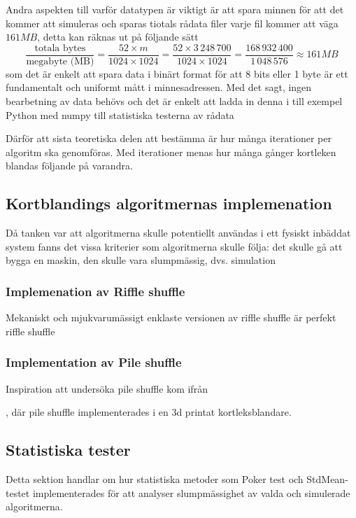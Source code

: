 \documentclass[swedish,a4paper]{article}
\begin{document}
Andra aspekten till varför datatypen är viktigt är att spara minnen för att det
kommer att simuleras och sparas tiotals rådata filer varje fil kommer att väga
$161 MB$,
detta kan räknas ut på följande sätt
$$ \frac{\text{totala bytes}}{\text{megabyte (MB)}} = \frac{52 \times m }{1024 \times
1024} = \frac{52 \times 3\,248\,700}{1024 \times 1024} = \frac{168\,932\,400}{1\,048\,576} \approx 161 MB 
$$
som det är enkelt att spara data i binärt format för att 8 bits eller 1 byte
är ett fundamentalt och uniformt mått i minnesadressen. Med det sagt, ingen
bearbetning av data behövs och det är enkelt att ladda in denna i till exempel Python
med numpy till statistiska testerna av rådata

Därför att sista teoretiska delen att bestämma
är hur många iterationer per algoritm ska genomföras. Med iterationer menas
hur många gånger kortleken blandas följande på varandra.

\subsection{Kortblandings algoritmernas implemenation}

Då tanken var att  algoritmerna skulle potentiellt användas i ett fysiskt
inbäddat system fanns det vissa  kriterier som algoritmerna skulle följa: det
skulle gå att bygga en maskin, den skulle vara slumpmässig, dvs. simulation

\subsubsection{Implemenation av Riffle shuffle}
Mekaniskt och mjukvarumässigt enklaste versionen av riffle shuffle är perfekt riffle shuffle

\subsubsection{Implementation av Pile shuffle}
Inspiration att undersöka pile shuffle kom ifrån

\textcite{3DprintedLife2021},
där pile shuffle implementerades i en 3d printat kortleksblandare.  


\subsection{Statistiska tester}
Detta sektion handlar om hur statistiska metoder som Poker test och 
StdMean-testet implementerades för att analyser slumpmässighet av valda
och simulerade algoritmerna.
\end{document}
